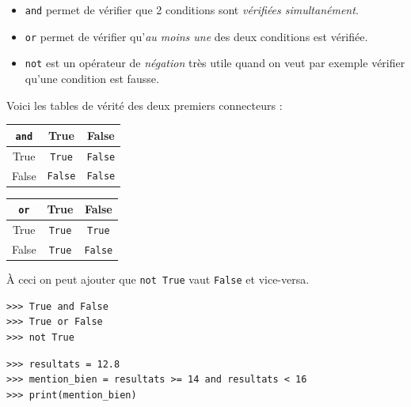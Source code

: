 \begin{itemize}
	\item   \texttt{and} permet de vérifier que 2 conditions sont \textit{vérifiées simultanément}.
	\item   \texttt{or} permet de vérifier qu'\textit{au moins une} des deux conditions est vérifiée.
	\item   \texttt{not} est un opérateur de \textit{négation} très utile quand on veut par exemple vérifier qu'une condition est fausse.
\end{itemize}
Voici les tables de vérité des deux premiers connecteurs :
\begin{center}
	\tabstyle[UGLiBlue]
	\begin{tabular}{|c|c|c|}
		\hline
		\cellcolor{white} \texttt{and} & \ccell True                & \ccell False               \\
		\hline
		\ccell True                                & \texttt{True}  & \texttt{False} \\
		\hline
		\ccell False                               & \texttt{False} & \texttt{False} \\
		\hline
	\end{tabular}\hspace{4em}
	\begin{tabular}{|c|c|c|}
		\hline
		\cellcolor{white} \texttt{or} & \ccell True                & \ccell False               \\
		\hline
		\ccell True                                & \texttt{True}  & \texttt{True} \\
		\hline
		\ccell False                               & \texttt{True} & \texttt{False} \\
		\hline
	\end{tabular}
\end{center}
À ceci on peut ajouter que \texttt{not True} vaut \texttt{False} et vice-versa.

\begin{pys}
	\begin{verbatim}
>>> True and False
>>> True or False
>>> not True
    \end{verbatim}
\end{pys}

\begin{pys}
	\begin{verbatim}
>>> resultats = 12.8
>>> mention_bien = resultats >= 14 and resultats < 16
>>> print(mention_bien)
    \end{verbatim}
\end{pys}

